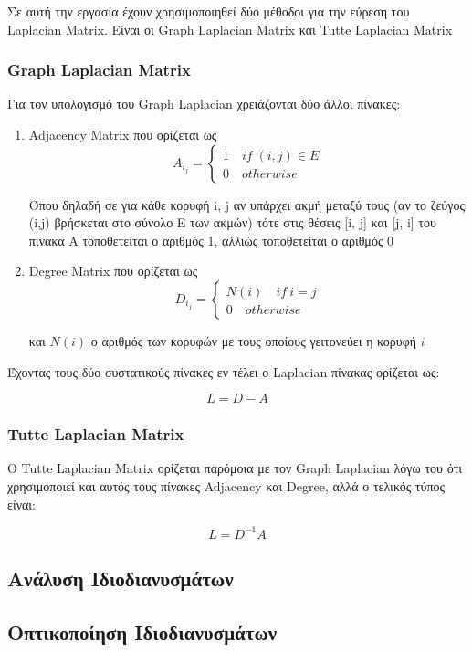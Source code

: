 \documentclass{article}
\begin{document}
Σε αυτή την εργασία έχουν χρησιμοποιηθεί δύο μέθοδοι για την εύρεση του Laplacian Matrix.
Είναι οι Graph Laplacian Matrix και Tutte Laplacian Matrix

\subsubsection{Graph Laplacian Matrix}
Για τον υπολογισμό του Graph Laplacian χρειάζονται δύο άλλοι πίνακες:
\begin{enumerate}
	\item Adjacency Matrix που ορίζεται ως
		\[
			A_i_j = \begin{cases}
				1 \quad if \; (i, j) \in E \\
				0 \quad otherwise
			\end{cases}
		\]

		Όπου δηλαδή σε για κάθε κορυφή i, j αν υπάρχει ακμή μεταξύ τους
		(αν το ζεύγος (i,j) βρήσκεται στο σύνολο Ε των ακμών)
		τότε στις θέσεις [i, j] και [j, i] του πίνακα Α τοποθετείται ο αριθμός 1,
		αλλιώς τοποθετείται ο αριθμός 0

	\item Degree Matrix που ορίζεται ως
		\[
			D_i_j = \begin{cases}
				N(i) \quad if \ i=j \\
				0 \quad otherwise
			\end{cases}
		\]

		και $N(i)$ ο αριθμός των κορυφών με τους οποίους γειτονεύει η κορυφή $i$
\end{enumerate}

\noindent
Έχοντας τους δύο συστατικούς πίνακες εν τέλει ο Laplacian πίνακας ορίζεται ως:

\[
	L = D - A
\]

\subsubsection{Tutte Laplacian Matrix}
Ο Tutte Laplacian Matrix ορίζεται παρόμοια με τον Graph Laplacian
λόγω του ότι χρησιμοποιεί και αυτός τους πίνακες Adjacency και Degree,
αλλά ο τελικός τύπος είναι:

\[
	L = D^{-1}A
\]

\subsection{Ανάλυση Ιδιοδιανυσμάτων}


\subsection{Οπτικοποίηση Ιδιοδιανυσμάτων}
\end{document}
